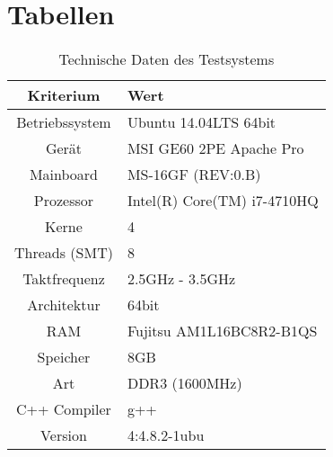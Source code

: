 \chapter*{Tabellen}

\begin{table}[h]
\begin{center}
\begin{tabular}{|c|l|}
\hline
\textbf{Kriterium} & \textbf{Wert}\\
\hline
Betriebssystem & Ubuntu 14.04LTS 64bit\\
\hline
Gerät & MSI GE60 2PE Apache Pro\\
\hline
Mainboard & MS-16GF (REV:0.B)\\
\hline
Prozessor & Intel(R) Core(TM) i7-4710HQ\\
Kerne & 4\\
Threads (SMT) & 8\\
Taktfrequenz & 2.5GHz - 3.5GHz\\
Architektur & 64bit\\
\hline
\ac{RAM} & Fujitsu AM1L16BC8R2-B1QS\\
Speicher & 8GB\\
Art & DDR3 (1600MHz)\\
\hline
C++ Compiler & g++\\
Version & 4:4.8.2-1ubu\\
\hline
\end{tabular}
\caption{Technische Daten des Testsystems}
\label{testsystem}
\end{center}
\end{table}

